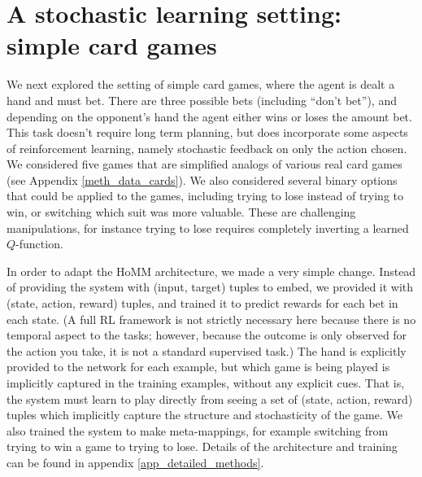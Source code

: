 \documentclass{article}
\begin{document}
\section{A stochastic learning setting: simple card games}\label{sec_cards}
\vspace{-0.5em} %
We next explored the setting of simple card games, where the agent is dealt a hand and must bet. There are three possible bets (including ``don't bet''), and depending on the opponent's hand the agent either wins or loses the amount bet. This task doesn't require long term planning, but does incorporate some aspects of reinforcement learning, namely stochastic feedback on only the action chosen. We considered five games that are simplified analogs of various real card games (see Appendix \ref{meth_data_cards}). We also considered several binary options that could be applied to the games, including trying to lose instead of trying to win, or switching which suit was more valuable. These are challenging manipulations, for instance trying to lose requires completely inverting a learned $Q$-function. \par
In order to adapt the HoMM architecture, we made a very simple change. Instead of providing the system with (input, target) tuples to embed, we provided it with (state, action, reward) tuples, and trained it to predict rewards for each bet in each state. (A full RL framework is not strictly necessary here because there is no temporal aspect to the tasks; however, because the outcome is only observed for the action you take, it is not a standard supervised task.) The hand is explicitly provided to the network for each example, but which game is being played is implicitly captured in the training examples, without any explicit cues. That is, the system must learn to play directly from seeing a set of (state, action, reward) tuples which implicitly capture the structure and stochasticity of the game. We also trained the system to make meta-mappings, for example switching from trying to win a game to trying to lose. Details of the architecture and training can be found in appendix \ref{app_detailed_methods}. \par
\vspace{-1em}
\end{document}
